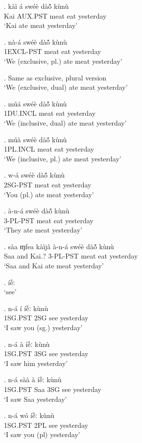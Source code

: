 \documentclass{assets/fieldnotes}
\begin{document}
{\exg. kàì á swéè dàó̃ kùnù\\
Kai AUX.PST meat eat yesterday \\%
    `Kai ate meat yesterday'

\exg. nà-á swéè dàó̃ kùnù\\
1EXCL-PST meat eat yesterday \\
    `We (exclusive, pl.) ate meat yesterday'

\ex. Same as exclusive, plural version\\
    `We (exclusive, dual) ate meat yesterday'

\exg. múá swéè dàó̃ kùnù\\
1DU.INCL meat eat yesterday \\
    `We (inclusive, dual) ate meat yesterday'

\exg. múà swéè dàó̃ kùnù\\
1PL.INCL meat eat yesterday \\
    `We (inclusive, pl.) ate meat yesterday'

\exg. w-á swéè dàó̃ kùnù\\
2SG-PST meat eat yesterday \\
    `You (pl.) ate meat yesterday'

\exg. à-n-á swéè dàó̃ kùnù\\
3-PL-PST meat eat yesterday \\
    `They ate meat yesterday'

\exg. sàa ɱfea kàìjâ à-n-á swéè dàó̃ kùnù\\
Saa and Kai.? 3-PL-PST meat eat yesterday \\
    `Saa and Kai ate meat yesterday'

\ex. íễː\\
    `see'

\exg. n-á í íễː kùnù\\
1SG.PST 2SG see yesterday \\
    `I saw you (sg.) yesterday'

\exg. n-á à íễː kùnù\\
1SG.PST 3SG see yesterday \\
    `I saw him yesterday'

\exg. n-á sàà à íễː kùnù\\
1SG.PST Saa 3SG see yesterday \\
    `I saw Saa yesterday'

\exg. n-á wó íễː kùnù \\
1SG.PST 2PL see yesterday \\
    `I saw you (pl) yesterday'

}
\end{document}
